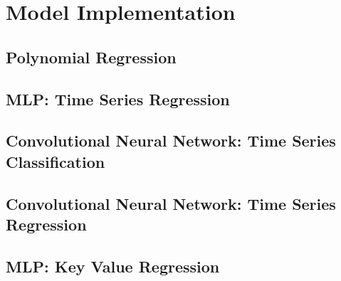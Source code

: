 \section{Model Implementation}

\subsection{Polynomial Regression}

\subsection{MLP: Time Series Regression}

\subsection{Convolutional Neural Network: Time Series Classification}

\subsection{Convolutional Neural Network: Time Series Regression}

\subsection{MLP: Key Value Regression}